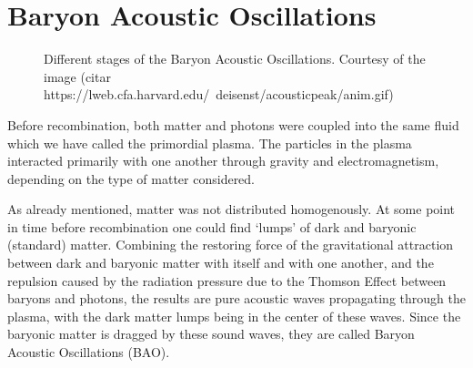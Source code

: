 \section{Baryon Acoustic Oscillations}

\begin{figure}[t]
	\centering
	\caption{Different stages of the Baryon Acoustic Oscillations. Courtesy of the image (citar https://lweb.cfa.harvard.edu/~deisenst/acousticpeak/anim.gif)}
\end{figure}

Before recombination, both matter and photons were coupled into the same fluid which we have called the primordial plasma. The particles in the plasma interacted primarily with one another through gravity and electromagnetism, depending on the type of matter considered. 

As already mentioned, matter was not distributed homogenously. At some point in time before recombination one could find `lumps' of dark and baryonic (standard) matter. Combining the restoring force of the gravitational attraction between dark and baryonic matter with itself and with one another, and the repulsion caused by the radiation pressure due to the Thomson Effect between baryons and photons, the results are pure acoustic waves propagating through the plasma, with the dark matter lumps being in the center of these waves. Since the baryonic matter is dragged by these sound waves, they are called Baryon Acoustic Oscillations (BAO).


